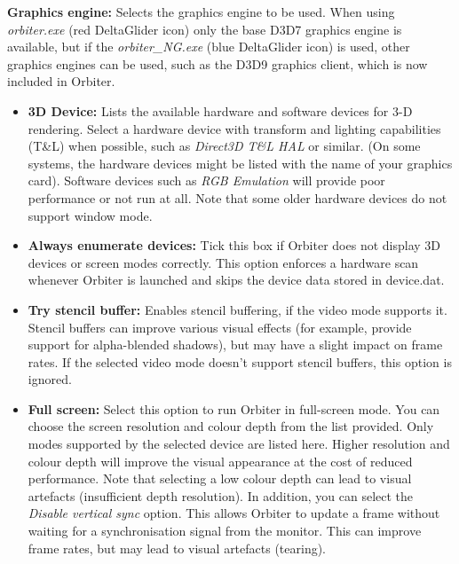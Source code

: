 \documentclass[Orbiter User Manual.tex]{subfiles}
\begin{document}
\begin{figure}[H]
	\centering
\end{figure}

\noindent
\textbf{Graphics engine:}
Selects the graphics engine to be used. When using \textit{orbiter.exe} (red DeltaGlider icon) only the base D3D7 graphics engine is available, but if the \textit{orbiter\_NG.exe} (blue DeltaGlider icon) is used, other graphics engines can be used, such as the D3D9 graphics client, which is now included in Orbiter.

\begin{itemize}
\item \textbf{3D Device:} Lists the available hardware and software devices for 3-D rendering. Select a hardware device with transform and lighting capabilities (T\&L) when possible, such as \textit{Direct3D T\&L HAL} or similar. (On some systems, the hardware devices might be listed with the name of your graphics card). Software devices such as \textit{RGB Emulation} will provide poor performance or not run at all. Note that some older hardware devices do not support window mode.
\item \textbf{Always enumerate devices:} Tick this box if Orbiter does not display 3D devices or screen modes correctly. This option enforces a hardware scan whenever Orbiter is launched and skips the device data stored in device.dat.
\item \textbf{Try stencil buffer:} Enables stencil buffering, if the video mode supports it. Stencil buffers can improve various visual effects (for example, provide support for alpha-blended shadows), but may have a slight impact on frame rates. If the selected video mode doesn't support stencil buffers, this option is ignored.
\item \textbf{Full screen:} Select this option to run Orbiter in full-screen mode. You can choose the screen resolution and colour depth from the list provided. Only modes supported by the selected device are listed here. Higher resolution and colour depth will improve the visual appearance at the cost of reduced performance. Note that selecting a low colour depth can lead to visual artefacts (insufficient depth resolution).\newline
In addition, you can select the \textit{Disable vertical sync} option. This allows Orbiter to update a frame without waiting for a synchronisation signal from the monitor. This can improve frame rates, but may lead to visual artefacts (tearing).\newline

\end{itemize}
\end{document}
